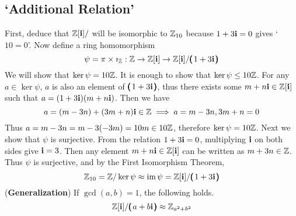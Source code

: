 \subsection{`Additional Relation'}
 First, deduce that \(\mathbb{Z}[\mathbf{i}]/\) will be isomorphic to \(\mathbb{Z}_{10}\) because \(1+3\mathbf{i} = 0\) gives `\(10 = 0\)'. Now define a ring homomorphism
\[
	\psi = \pi \times \imath_{\mathbb{Z}} : \mathbb{Z} \rightarrow \mathbb{Z}[\mathbf{i}] \rightarrow \mathbb{Z}[\mathbf{i}]/\pmb{\left(\right.}1+3\mathbf{i}\pmb{\left.\right)}
\]
We will show that \(\ker \psi = 10\mathbb{Z}\). It is enough to show that \(\ker \psi \leq 10\mathbb{Z}\). For any \(a\in \ker\psi\), \(a\) is also an element of \(\pmb{\left(\right.}1+3\mathbf{i}\pmb{\left.\right)}\), thus there exists some \(m+n\mathbf{i}\in \mathbb{Z}[\mathbf{i}]\) such that \(a = (1+3\mathbf{i})(m+n\mathbf{i})\). Then we have
\[
	a = (m-3n) + (3m + n)\mathbf{i}\in \mathbb{Z} \implies a = m - 3n, 3m+n = 0
\]
Thus \(a = m - 3n = m - 3(-3m) = 10m \in 10\mathbb{Z}\), therefore \(\ker\psi  = 10\mathbb{Z}\). Next we show that \(\psi\) is surjective. From the relation \(1+3\mathbf{i} = 0\), multiplying \(\mathbf{i}\) on both sides give \(\mathbf{i} = 3\). Then any element \(m+n\mathbf{i} \in \mathbb{Z}[\mathbf{i}]\) can be written as \(m+3n\in \mathbb{Z}\). Thus \(\psi\) is surjective, and by the First Isomorphism Theorem,
\[
	\mathbb{Z}_{10} = \mathbb{Z}/\ker\psi \approx \operatorname{im}\psi = \mathbb{Z}[\mathbf{i}]/\pmb{\left(\right.}1+3\mathbf{i}\pmb{\left.\right)}
\]
(\textbf{Generalization}) If \(\gcd(a, b) = 1\), the following holds.
\[
	\mathbb{Z}[\mathbf{i}]/\pmb{\left(\right.}a+b\mathbf{i}\pmb{\left.\right)} \approx \mathbb{Z}_{a^2+b^2}
\]